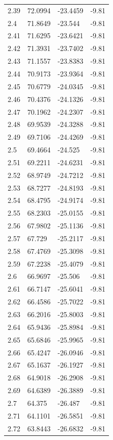 \begin{tabular}{llll}
2.39 & 72.0994 & -23.4459 & -9.81 \\
2.4 & 71.8649 & -23.544 & -9.81 \\
2.41 & 71.6295 & -23.6421 & -9.81 \\
2.42 & 71.3931 & -23.7402 & -9.81 \\
2.43 & 71.1557 & -23.8383 & -9.81 \\
2.44 & 70.9173 & -23.9364 & -9.81 \\
2.45 & 70.6779 & -24.0345 & -9.81 \\
2.46 & 70.4376 & -24.1326 & -9.81 \\
2.47 & 70.1962 & -24.2307 & -9.81 \\
2.48 & 69.9539 & -24.3288 & -9.81 \\
2.49 & 69.7106 & -24.4269 & -9.81 \\
2.5 & 69.4664 & -24.525 & -9.81 \\
2.51 & 69.2211 & -24.6231 & -9.81 \\
2.52 & 68.9749 & -24.7212 & -9.81 \\
2.53 & 68.7277 & -24.8193 & -9.81 \\
2.54 & 68.4795 & -24.9174 & -9.81 \\
2.55 & 68.2303 & -25.0155 & -9.81 \\
2.56 & 67.9802 & -25.1136 & -9.81 \\
2.57 & 67.729 & -25.2117 & -9.81 \\
2.58 & 67.4769 & -25.3098 & -9.81 \\
2.59 & 67.2238 & -25.4079 & -9.81 \\
2.6 & 66.9697 & -25.506 & -9.81 \\
2.61 & 66.7147 & -25.6041 & -9.81 \\
2.62 & 66.4586 & -25.7022 & -9.81 \\
2.63 & 66.2016 & -25.8003 & -9.81 \\
2.64 & 65.9436 & -25.8984 & -9.81 \\
2.65 & 65.6846 & -25.9965 & -9.81 \\
2.66 & 65.4247 & -26.0946 & -9.81 \\
2.67 & 65.1637 & -26.1927 & -9.81 \\
2.68 & 64.9018 & -26.2908 & -9.81 \\
2.69 & 64.6389 & -26.3889 & -9.81 \\
2.7 & 64.375 & -26.487 & -9.81 \\
2.71 & 64.1101 & -26.5851 & -9.81 \\
2.72 & 63.8443 & -26.6832 & -9.81 \\

\end{tabular}
